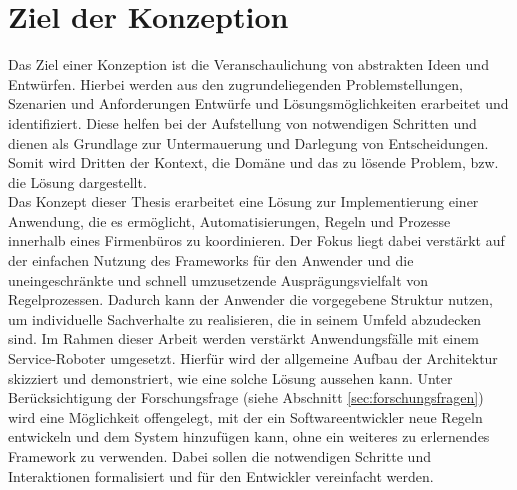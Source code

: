 \section{Ziel der Konzeption}
\label{sec:konzeptziele}
    Das Ziel einer Konzeption ist die Veranschaulichung von abstrakten Ideen und Entwürfen. %
    Hierbei werden aus den zugrundeliegenden Problemstellungen, Szenarien und Anforderungen Entwürfe und 
    Lösungsmöglichkeiten erarbeitet und identifiziert. Diese helfen bei der Aufstellung von notwendigen Schritten 
    und dienen als Grundlage zur Untermauerung und Darlegung von Entscheidungen. Somit wird Dritten der Kontext, die 
    Domäne und das zu lösende Problem, bzw. die Lösung dargestellt. 
    \\
    \linebreak
    Das Konzept dieser Thesis 
    erarbeitet eine Lösung zur Implementierung einer Anwendung, die es ermöglicht, Automatisierungen, Regeln und Prozesse innerhalb eines 
    Firmenbüros zu koordinieren. Der Fokus liegt dabei verstärkt auf der einfachen Nutzung des Frameworks für den Anwender und 
    die uneingeschränkte und schnell umzusetzende Ausprägungsvielfalt von Regelprozessen. Dadurch kann der Anwender die vorgegebene Struktur nutzen, um individuelle 
    Sachverhalte zu realisieren, die in seinem Umfeld abzudecken sind. Im Rahmen dieser Arbeit werden verstärkt Anwendungsfälle mit einem Service-Roboter 
    umgesetzt.
    Hierfür wird der allgemeine Aufbau der Architektur skizziert und demonstriert, wie eine solche Lösung aussehen kann. 
    Unter Berücksichtigung der Forschungsfrage (siehe Abschnitt \ref{sec:forschungsfragen}) wird eine Möglichkeit offengelegt, mit der 
    ein Softwareentwickler neue Regeln entwickeln und dem System hinzufügen kann, ohne ein weiteres zu erlernendes Framework zu verwenden. 
    Dabei sollen die notwendigen Schritte und Interaktionen formalisiert und für den Entwickler vereinfacht werden. 


